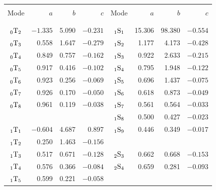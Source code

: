 \begin{table}[!b]
\centering
\label{table:14.abc}
\begin{tabular}{|c|r|r|r||c|r|r|r|} \hline
     &     &     &     &     &     &    & \\
Mode & $a$\hspace{4.5 mm} & $b$\hspace{4.0 mm} & $c$\hspace{5.0 mm} &
Mode & $a$\hspace{4.0 mm} & $b$\hspace{4.0 mm} & $c$\hspace{5.0 mm} \\
     &     &     &     &     &     &     & \\ \hline
     &     &     &     &     &     &     & \\
${}_{0}{\rm T}_{2}$ &  $-1.335$ &   5.090 &  $-0.231$ &
${}_{1}{\rm S}_{1}$ &   15.306 &   98.380 &  $-0.554$ \\
${}_{0}{\rm T}_{3}$ &   0.558 &   1.647 &  $-0.279$ &
${}_{1}{\rm S}_{2}$ &   1.177 &   4.173 &  $-0.428$ \\
${}_{0}{\rm T}_{4}$ &   0.849 &   0.757 &  $-0.162$ &
${}_{1}{\rm S}_{3}$ &   0.922 &   2.633 &  $-0.215$ \\
${}_{0}{\rm T}_{5}$ &   0.917 &   0.416 &  $-0.102$ &
${}_{1}{\rm S}_{4}$ &   0.795 &   1.948 &  $-0.122$ \\
${}_{0}{\rm T}_{6}$ &   0.923 &   0.256 &  $-0.069$ &
${}_{1}{\rm S}_{5}$ &   0.696 &   1.437 &  $-0.075$ \\
${}_{0}{\rm T}_{7}$ &   0.926 &   0.170 &  $-0.050$ &
${}_{1}{\rm S}_{6}$ &   0.618 &   0.873 &  $-0.049$ \\
${}_{0}{\rm T}_{8}$ &   0.961 &   0.119 &  $-0.038$ &
${}_{1}{\rm S}_{7}$ &   0.561 &   0.564 &  $-0.033$ \\
     &     &     &    &
${}_{1}{\rm S}_{8}$ &   0.500 &   0.427 &  $-0.023$ \\
${}_{1}{\rm T}_{1}$ &  $-0.604$ &   4.687 &   0.897 &
${}_{1}{\rm S}_{9}$ &   0.446 &   0.349 &  $-0.017$ \\
${}_{1}{\rm T}_{2}$ &   0.250 &   1.463 &  $-0.156$ &
     &     &     &     \\
${}_{1}{\rm T}_{3}$ &   0.517 &   0.671 &  $-0.128$ &
${}_{2}{\rm S}_{3}$ &   0.662 &   0.668 &  $-0.153$ \\
${}_{1}{\rm T}_{4}$ &   0.576 &   0.366 &  $-0.084$ &
${}_{2}{\rm S}_{4}$ &   0.659 &   0.281 &  $-0.093$ \\
${}_{1}{\rm T}_{5}$ &   0.599 &   0.221 &  $-0.058$ &

\end{tabular}
\end{table}
